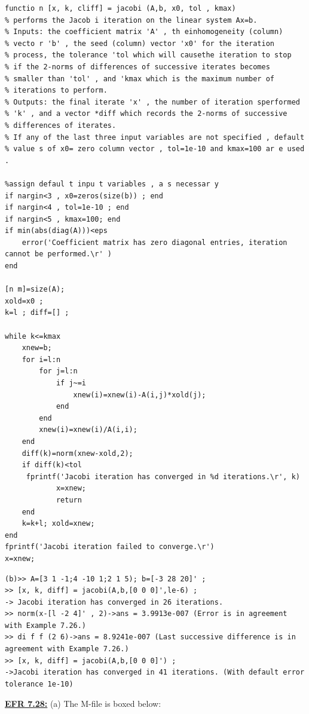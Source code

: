 \documentclass[../main.tex]{subfiles}
\begin{document}
\begin{lstlisting}[numbers=none]
functio n [x, k, cliff] = jacobi (A,b, x0, tol , kmax) 
% performs the Jacob i iteration on the linear system Ax=b. 
% Inputs: the coefficient matrix 'A' , th einhomogeneity (column) 
% vecto r 'b' , the seed (column) vector 'x0' for the iteration 
% process, the tolerance 'tol which will causethe iteration to stop 
% if the 2-norms of differences of successive iterates becomes 
% smaller than 'tol' , and 'kmax which is the maximum number of 
% iterations to perform. 
% Outputs: the final iterate 'x' , the number of iteration sperformed 
% 'k' , and a vector *diff which records the 2-norms of successive 
% differences of iterates. 
% If any of the last three input variables are not specified , default 
% value s of x0= zero column vector , tol=1e-10 and kmax=100 ar e used .
 
%assign defaul t inpu t variables , a s necessar y 
if nargin<3 , x0=zeros(size(b)) ; end 
if nargin<4 , tol=1e-10 ; end 
if nargin<5 , kmax=100; end 
if min(abs(diag(A)))<eps 
	error('Coefficient matrix has zero diagonal entries, iteration 
cannot be performed.\r' ) 
end 

[n m]=size(A); 
xold=x0 ; 
k=l ; diff=[] ; 

while k<=kmax
	xnew=b; 
	for i=l:n 
		for j=l:n 
			if j~=i 
				xnew(i)=xnew(i)-A(i,j)*xold(j); 
			end 
		end 
		xnew(i)=xnew(i)/A(i,i); 
	end 
	diff(k)=norm(xnew-xold,2); 
	if diff(k)<tol 
	 fprintf('Jacobi iteration has converged in %d iterations.\r', k) 
			x=xnew; 
			return 
	end 
	k=k+l; xold=xnew; 
end 
fprintf('Jacobi iteration failed to converge.\r') 
x=xnew; 
\end{lstlisting}
\begin{lstlisting}[numbers=none]
(b)>> A=[3 1 -1;4 -10 1;2 1 5); b=[-3 28 20]' ; 
>> [x, k, diff] = jacobi(A,b,[0 0 0]',le-6) ; 
-> Jacobi iteration has converged in 26 iterations. 
>> norm(x-[l -2 4]' , 2)->ans = 3.9913e-007 (Error is in agreement with Example 7.26.) 
>> di f f (2 6)->ans = 8.9241e-007 (Last successive difference is in agreement with Example 7.26.) 
>> [x, k, diff] = jacobi(A,b,[0 0 0]') ; 
->Jacobi iteration has converged in 41 iterations. (With default error tolerance 1e-10) 
\end{lstlisting}
\textbf{\underline{EFR 7.28:}} (a) The M-file is boxed below:
\end{document}
